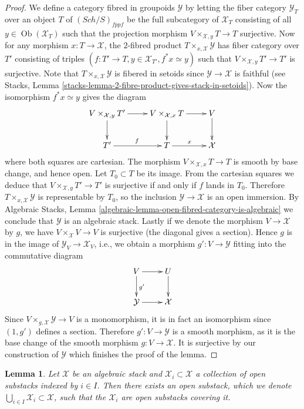 \documentclass{stacks-project}
\theoremstyle{plain}
\newtheorem{lemma}[subsection]{Lemma}
\theoremstyle{definition}
\theoremstyle{remark}
\numberwithin{equation}{subsection}
\def\Sch{\mathit{Sch}}
\def\Ob{\mathop{\mathrm{Ob}}\nolimits}
\begin{document}
\begin{proof}
We define a category fibred in groupoids $\mathcal Y$ by letting the fiber
category $\mathcal{Y}_T$ over an object $T$ of $(\Sch/S)_{fppf}$ be
the full subcategory of $\mathcal{X}_T$ consisting of all
$y \in \Ob(\mathcal{X}_T)$ such that the projection morphism
$V \times_{\mathcal X, y} T \to T$ surjective. Now for any morphism
$x : T \to \mathcal X$, the $2$-fibred product
$T \times_{x, \mathcal X} \mathcal Y$ has fiber category over $T'$ consisting
of triples $(f : T' \to T, y \in \mathcal{X}_{T'}, f^*x \simeq y)$ such that
$V \times_{\mathcal X, y} T' \to T'$ is surjective.
Note that $T \times_{x, \mathcal X} \mathcal Y$ is fibered in setoids since
$\mathcal Y \to \mathcal X$ is faithful (see
Stacks, Lemma \ref{stacks-lemma-2-fibre-product-gives-stack-in-setoids}).
Now the isomorphism $f^*x \simeq y$ gives the diagram
$$
\xymatrix{
V \times_{\mathcal X, y} T' \ar[d] \ar[r] &
V \times_{\mathcal X, x} T \ar[r] \ar[d] &
V \ar[d] \\
T' \ar[r]^f &
T \ar[r]^x &
\mathcal X
}
$$
where both squares are cartesian. The morphism
$V \times_{\mathcal X, x} T \to T$ is smooth by base change, and hence open.
Let $T_0 \subset T$ be its image. From the cartesian squares we deduce that
$V \times_{\mathcal X, y} T' \to T'$ is surjective if and only if $f$ lands
in $T_0$.  Therefore $T \times_{x, \mathcal X} \mathcal Y$ is representable by
$T_0$, so the inclusion $\mathcal Y \to \mathcal X$ is an open immersion.
By
Algebraic Stacks, Lemma \ref{algebraic-lemma-open-fibred-category-is-algebraic}
we conclude that $\mathcal{Y}$ is an algebraic stack.
Lastly if we denote the morphism $V \to \mathcal X$ by $g$, we have
$V \times_{\mathcal X} V \to V$ is surjective (the diagonal gives a
section). Hence $g$ is in the image of $\mathcal{Y}_V \to \mathcal{X}_V$, i.e.,
we obtain a morphism $g' : V \to \mathcal{Y}$ fitting into the commutative
diagram
$$
\xymatrix{
V \ar[r] \ar[d]^{g'} & U \ar[d] \\
\mathcal{Y} \ar[r] & \mathcal{X}
}
$$
Since $V \times_{g, \mathcal X} \mathcal Y \to V$ is a
monomorphism, it is in fact an isomorphism since $(1, g')$ defines a section.
Therefore $g' : V \to \mathcal Y$ is a smooth morphism, as it is the
base change of the smooth morphism $g : V \to \mathcal{X}$.
It is surjective by our construction of $\mathcal{Y}$ which finishes
the proof of the lemma.
\end{proof}

\begin{lemma}
\label{lemma-union-open-substacks}
Let $\mathcal X$ be an algebraic stack and $\mathcal{X}_i \subset \mathcal X$
a collection of open substacks indexed by $i \in I$. Then there exists an
open substack, which we denote
$\bigcup_{i\in I} \mathcal{X}_i \subset \mathcal X$, such that
the $\mathcal{X}_i$ are open substacks covering it.
\end{lemma}
\end{document}
